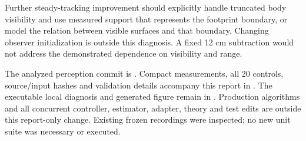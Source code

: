 \documentclass[11pt]{article}
\begin{document}
Further steady-tracking improvement should explicitly handle truncated body
visibility and use measured support that represents the footprint boundary,
or model the relation between visible surfaces and that boundary. Changing
observer initialization is outside this diagnosis. A fixed 12 cm subtraction
would not address the demonstrated dependence on visibility and range.

The analyzed perception commit is
.
Compact measurements, all 20 controls, source/input hashes and validation
details accompany this report in
.
The executable local diagnosis and generated figure remain in
.
Production algorithms and all concurrent controller, estimator, adapter,
theory and test edits are outside this report-only change. Existing frozen
recordings were inspected; no new unit suite was necessary or executed.
\end{document}
